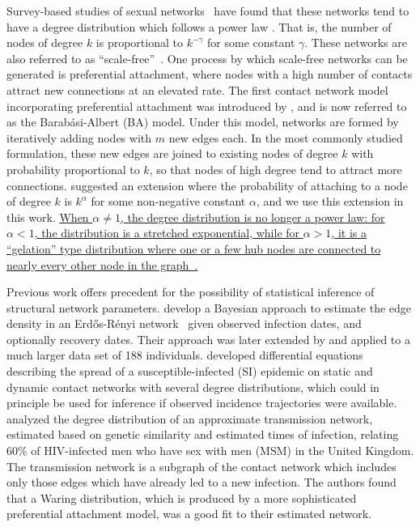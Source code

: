 \documentclass[12pt]{article}\usepackage[]{graphicx}\usepackage[]{color}
\let\mciteauthor\citeauthor
\renewcommand{\citeauthor}[1]{\mbox{\mciteauthor{#1}}}
\newcommand{\add}[1]{\color{blue} \uline{#1} \color{black}}
\begin{document}
Survey-based studies of sexual networks~\autocite{colgate1989risk,
liljeros2001web, schneeberger2004scale, latora2006network, rothenberg2007large,
clemenccon2015statistical} have found that these networks tend to have a degree
distribution which follows a power law \autocite[although there has been some
disagreement, see][]{handcock2004likelihood}. That is, the number of nodes of
degree $k$ is proportional to $k^{-\gamma}$ for some constant $\gamma$. These
networks are also referred to as
``scale-free''~\autocite{barabasi1999emergence}. One process by which
scale-free networks can be generated is preferential attachment, where nodes
with a high number of contacts attract new connections at an elevated rate. The
first contact network model incorporating preferential attachment was
introduced by \textcite{barabasi1999emergence}, and is now referred to as the
Barab\'asi-Albert (BA) model. Under this model, networks are formed by
iteratively adding nodes with $m$ new edges each. In the most commonly studied
formulation, these new edges are joined to existing nodes of degree $k$ with
probability proportional to $k$, so that nodes of high degree tend to attract
more connections. \citeauthor{barabasi1999emergence} suggested an extension
where the probability of attaching to a node of degree $k$ is $k^\alpha$ for
some non-negative constant $\alpha$, and we use this extension in this work.
\add{When $\alpha \neq 1$, the degree distribution is no longer a power law:
for $\alpha < 1$, the distribution is a stretched exponential, while for
$\alpha > 1$, it is a ``gelation'' type distribution where one or a few hub
nodes are connected to nearly every other node in the
graph~\autocite{krapivsky2000connectivity}.}

Previous work offers precedent for the possibility of statistical inference of
structural network parameters. \textcite{britton2002bayesian} develop a Bayesian
approach to estimate the edge density in an Erd\H{o}s-R\'enyi
network~\autocite{erdos1960evolution} given observed infection dates, and
optionally recovery dates. Their approach was later extended by
\textcite{groendyke2011bayesian} and applied to a much larger data set of 188
individuals. \textcite{volz2007susceptible, volz2008sir} developed differential
equations describing the spread of a susceptible-infected (SI) epidemic on
static and dynamic contact networks with several degree distributions, which
could in principle be used for inference if observed incidence trajectories
were available. \textcite{brown2011transmission} analyzed the degree distribution
of an approximate transmission network, estimated based on genetic similarity
and estimated times of infection, relating 60\% of HIV-infected men who have
sex with men (MSM) in the United Kingdom. The transmission network is a
subgraph of the contact network which includes only those edges which have
already led to a new infection. The authors found that a Waring distribution,
which is produced by a more sophisticated preferential attachment model, was a
good fit to their estimated network. 
\end{document}
